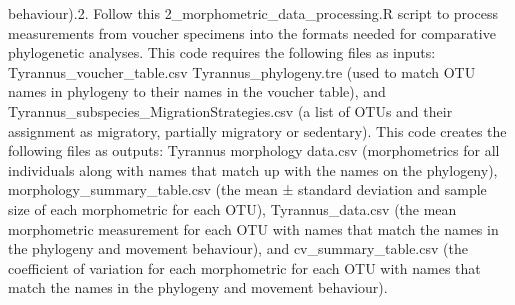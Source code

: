 \documentclass[]{article}
\begin{document}
{{behaviour).}{2. Follow this 2\_morphometric\_data\_processing.R script to process measurements from voucher specimens into the formats needed for comparative phylogenetic analyses. This code requires the following files as inputs: Tyrannus\_voucher\_table.csv Tyrannus\_phylogeny.tre (used to match OTU names in phylogeny to their names in the voucher table), and Tyrannus\_subspecies\_MigrationStrategies.csv (a list of OTUs and their assignment as migratory, partially migratory or sedentary). This code creates the following files as outputs: Tyrannus morphology data.csv (morphometrics for all individuals along with names that match up with the names on the phylogeny), morphology\_summary\_table.csv (the mean ± standard deviation and sample size of each morphometric for each OTU), Tyrannus\_data.csv (the mean morphometric measurement for each OTU with names that match the names in the phylogeny and movement behaviour), and cv\_summary\_table.csv (the coefficient of variation for each morphometric for each OTU with names that match the names in the phylogeny and movement behaviour).}}\label{follow-this-2_morphometric_data_processing.r-script-to-process-measurements-from-voucher-specimens-into-the-formats-needed-for-comparative-phylogenetic-analyses.-this-code-requires-the-following-files-as-inputs-tyrannus_voucher_table.csv-tyrannus_phylogeny.tre-used-to-match-otu-names-in-phylogeny-to-their-names-in-the-voucher-table-and-tyrannus_subspecies_migrationstrategies.csv-a-list-of-otus-and-their-assignment-as-migratory-partially-migratory-or-sedentary.-this-code-creates-the-following-files-as-outputs-tyrannus-morphology-data.csv-morphometrics-for-all-individuals-along-with-names-that-match-up-with-the-names-on-the-phylogeny-morphology_summary_table.csv-the-mean-standard-deviation-and-sample-size-of-each-morphometric-for-each-otu-tyrannus_data.csv-the-mean-morphometric-measurement-for-each-otu-with-names-that-match-the-names-in-the-phylogeny-and-movement-behaviour-and-cv_summary_table.csv-the-coefficient-of-variation-for-each-morphometric-for-each-otu-with-names-that-match-the-names-in-the-phylogeny-and-movement-behaviour.}
\end{document}

